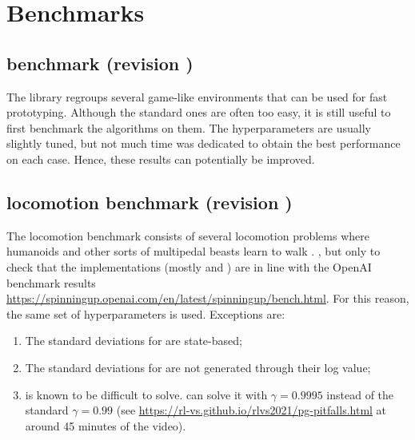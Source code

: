 \chapter{Benchmarks}

\section{\gym benchmark (revision )}

The \gym library regroups several game-like environments that can be used for fast prototyping. Although the standard ones are often too easy, it is still useful to first benchmark the algorithms on them. The hyperparameters are usually slightly tuned, but not much time was dedicated to obtain the best performance on each case. Hence, these results can potentially be improved.



\section{\mujoco locomotion benchmark (revision )}

The \mujoco locomotion benchmark consists of several locomotion problems where humanoids and other sorts of multipedal beasts learn to walk \cite{mujoco}. , but only to check that the implementations (mostly \tdt and \sac) are in line with the OpenAI benchmark results \url{https://spinningup.openai.com/en/latest/spinningup/bench.html}. For this reason, the same set of hyperparameters is used. Exceptions are:

\begin{enumerate}
	\item The standard deviations for \ppo are state-based;
	\item The standard deviations for \sac are not generated through their log value;
	\item {} is known to be difficult to solve. \ppo can solve it with $\gamma = 0.9995$ instead of the standard $\gamma = 0.99$ (see \url{https://rl-vs.github.io/rlvs2021/pg-pitfalls.html} at around 45 minutes of the video).
\end{enumerate}

